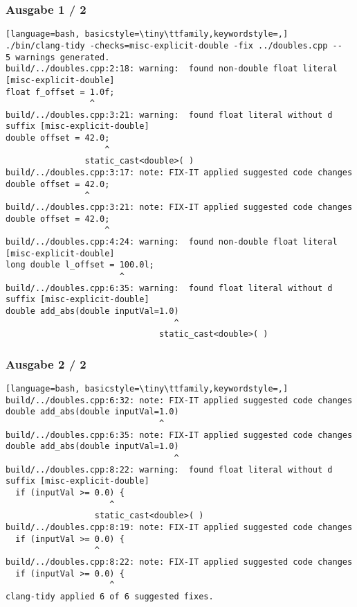 \documentclass[aspectratio=169]{beamer}
\begin{document}
\begin{frame}[fragile]
  \frametitle{Ausgabe 1 / 2}
  \begin{lstlisting}[language=bash, basicstyle=\tiny\ttfamily,keywordstyle=,]
./bin/clang-tidy -checks=misc-explicit-double -fix ../doubles.cpp -- 
5 warnings generated.
build/../doubles.cpp:2:18: warning:  found non-double float literal [misc-explicit-double]
float f_offset = 1.0f;
                 ^
build/../doubles.cpp:3:21: warning:  found float literal without d suffix [misc-explicit-double]
double offset = 42.0;
                    ^
                static_cast<double>( )
build/../doubles.cpp:3:17: note: FIX-IT applied suggested code changes
double offset = 42.0;
                ^
build/../doubles.cpp:3:21: note: FIX-IT applied suggested code changes
double offset = 42.0;
                    ^
build/../doubles.cpp:4:24: warning:  found non-double float literal [misc-explicit-double]
long double l_offset = 100.0l;
                       ^
build/../doubles.cpp:6:35: warning:  found float literal without d suffix [misc-explicit-double]
double add_abs(double inputVal=1.0)
                                  ^
                               static_cast<double>( )
  \end{lstlisting}
\end{frame}
\begin{frame}[fragile]
  \frametitle{Ausgabe 2 / 2}
  \begin{lstlisting}[language=bash, basicstyle=\tiny\ttfamily,keywordstyle=,]
build/../doubles.cpp:6:32: note: FIX-IT applied suggested code changes
double add_abs(double inputVal=1.0)
                               ^
build/../doubles.cpp:6:35: note: FIX-IT applied suggested code changes
double add_abs(double inputVal=1.0)
                                  ^
build/../doubles.cpp:8:22: warning:  found float literal without d suffix [misc-explicit-double]
  if (inputVal >= 0.0) {
                     ^
                  static_cast<double>( )
build/../doubles.cpp:8:19: note: FIX-IT applied suggested code changes
  if (inputVal >= 0.0) {
                  ^
build/../doubles.cpp:8:22: note: FIX-IT applied suggested code changes
  if (inputVal >= 0.0) {
                     ^
clang-tidy applied 6 of 6 suggested fixes.
  \end{lstlisting}
\end{frame}

\begin{frame}[fragile]
  \frametitle{Gefixted Beispiel}
  C++}, basicstyle=\small\ttfamily, keywordstyle=\color{blue}, emph={FIXME}, emphstyle=\color{red}]{doubles.cpp}
\end{frame}
\end{document}
